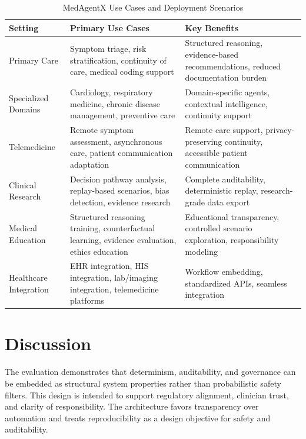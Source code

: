 \documentclass[journal]{IEEEtran}
\begin{document}
\begin{table}[H]
\centering
\caption{MedAgentX Use Cases and Deployment Scenarios}
\label{tab:use_cases}
\small
\begin{tabular}{@{}>{\raggedright\arraybackslash}p{}>{\raggedright\arraybackslash}p{}>{\raggedright\arraybackslash}p{}@{}}
\toprule
\textbf{Setting} & \textbf{Primary Use Cases} & \textbf{Key Benefits} \\
\midrule
Primary Care & Symptom triage, risk stratification, continuity of care, medical coding support & Structured reasoning, evidence-based recommendations, reduced documentation burden \\
Specialized Domains & Cardiology, respiratory medicine, chronic disease management, preventive care & Domain-specific agents, contextual intelligence, continuity support \\
Telemedicine & Remote symptom assessment, asynchronous care, patient communication adaptation & Remote care support, privacy-preserving continuity, accessible patient communication \\
Clinical Research & Decision pathway analysis, replay-based scenarios, bias detection, evidence research & Complete auditability, deterministic replay, research-grade data export \\
Medical Education & Structured reasoning training, counterfactual learning, evidence evaluation, ethics education & Educational transparency, controlled scenario exploration, responsibility modeling \\
Healthcare Integration & EHR integration, HIS integration, lab/imaging integration, telemedicine platforms & Workflow embedding, standardized APIs, seamless integration \\
\bottomrule
\end{tabular}
\end{table}

\newpage
\section{Discussion}
The evaluation demonstrates that determinism, auditability, and governance can be embedded as structural system properties rather than probabilistic safety filters. This design is intended to support regulatory alignment, clinician trust, and clarity of responsibility. The architecture favors transparency over automation and treats reproducibility as a design objective for safety and auditability.
\end{document}

